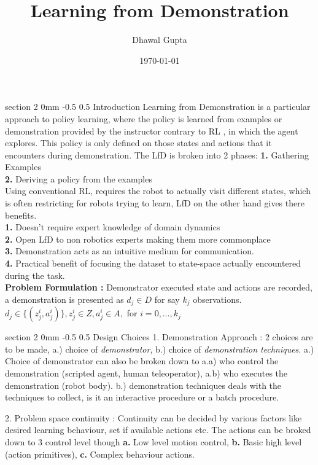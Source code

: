 \documentclass[twocolumn,11pt]{article}
\title{Learning  from Demonstration}
\author{Dhawal Gupta}
\date{\today}
\makeatletter
\renewcommand{\section}{\@startsection
{section}%
{2}%
{0mm}%
{-0.5\baselineskip}%
{0.5\baselineskip}%
{\bfseries\color{blue}}} %
\makeatother
\begin{document}
\maketitle

\section{Introduction}
Learning from Demonstration is a particular approach to policy learning, where the policy is learned from examples or demonstration provided by the instructor contrary to RL , in which the agent explores. This policy is only defined on those states and actions that it encounters during demonstration. 
The LfD is broken into 2 phases:
\textbf{1. }Gathering Examples\\
\textbf{2. }Deriving a policy from the examples\\
Using conventional RL, requires the robot to actually visit different states, which is often restricting for robots trying to learn, LfD on the other hand gives there benefits.\\
\textbf{1. } Doesn't require expert knowledge of domain dynamics\\
\textbf{2. } Open LfD to non robotics experts making them more commonplace\\
\textbf{3. } Demonstration acts as an intuitive medium for communication.\\
\textbf{4. } Practical benefit of focusing the dataset to state-space actually encountered during the task.\\
\textbf{Problem Formulation : } Demonstrator executed state and actions are recorded, a demonstration is presented as $d_j \in D$ for say $k_j$ observations. $d_j \in \{  (z_j^i, a_j^i)\}, z_j^i \in Z, a_j^i \in A, $ for $i = 0, \ldots , k_j$

\section{Design Choices}
1. Demonstration Approach :  2 choices are to be made, a.) choice of \textit{demonstrator}, b.) choice of \textit{demonstration techniques}.  
a.) Choice of demonstrator can also be broken down to a.a) who control the demonstration (scripted agent, human teleoperator), a.b) who executes the demonstration (robot body).
b.) demonstration techniques deals with the techniques to collect, is it an interactive procedure or a batch procedure. 

2. Problem space continuity : Continuity can be decided by various factors like desired learning behaviour, set if available actions etc. The actions can be broked down to 3 control level though \textbf{a.} Low level motion control, \textbf{b.} Basic high level (action primitives), \textbf{c. } Complex behaviour actions. 
\end{document}
